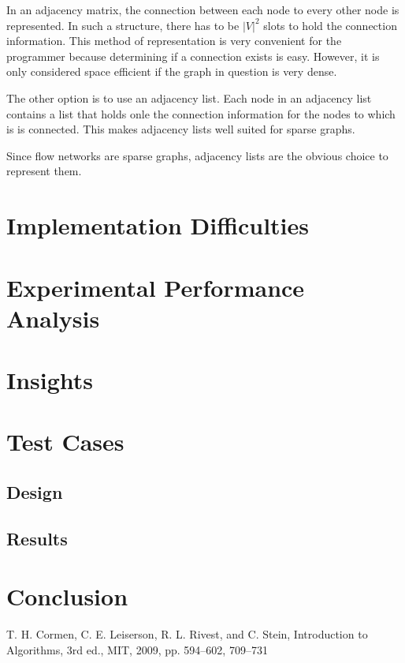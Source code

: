 \documentclass[conference]{IEEEtran}
\begin{document}
In an adjacency matrix, the connection between each node to every other node is represented.
In such a structure, there has to be $|V|^2$ slots to hold the connection information. This
method of representation is very convenient for the programmer because determining if a 
connection exists is easy. However, it is only considered space efficient if the graph in
question is very dense. 

The other option is to use an adjacency list. Each node in an adjacency list contains a list 
that holds onle the connection information for the nodes to which is is connected. This makes 
adjacency lists well suited for sparse graphs. 

Since flow networks are sparse graphs, adjacency lists are the obvious choice to represent them.

\section{Implementation Difficulties}


\section{Experimental Performance Analysis}

\section{Insights}

\section{Test Cases}
\subsection{Design}
\subsection{Results}

\section{Conclusion}

\begin{thebibliography}{00}
     T. H. Cormen, C. E. Leiserson, R. L. Rivest, and C. Stein, Introduction to Algorithms, 3rd ed., MIT, 2009, pp. 594--602, 709--731 
\end{thebibliography}
\end{document}
